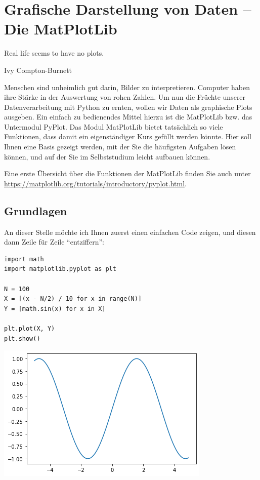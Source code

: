 \chapter{Grafische Darstellung von Daten -- Die MatPlotLib}
\label{chp:Matplotlib}
\epigraph{
	Real life seems to have no plots.
}{Ivy Compton-Burnett}

Menschen sind unheimlich gut darin, Bilder zu interpretieren. Computer haben ihre Stärke in der Auswertung von rohen Zahlen. Um nun die Früchte unserer Datenverarbeitung mit Python zu ernten, wollen wir Daten als graphische Plots ausgeben. Ein einfach zu bedienendes Mittel hierzu ist die MatPlotLib bzw. das Untermodul PyPlot. Das Modul MatPlotLib bietet tatsächlich so viele Funktionen, dass damit ein eigenständiger Kurs gefüllt werden könnte. Hier soll Ihnen eine Basis gezeigt werden, mit der Sie die häufigsten Aufgaben lösen können, und auf der Sie im Selbststudium leicht aufbauen können.

Eine erste Übersicht über die Funktionen der MatPlotLib finden Sie auch unter \url{https://matplotlib.org/tutorials/introductory/pyplot.html}.

\section{Grundlagen}
An dieser Stelle möchte ich Ihnen zuerst einen einfachen Code zeigen, und diesen dann Zeile für Zeile \enquote{entziffern}:

\begin{codebox}[Beispiel: Einfacher Plot, width=.55\linewidth, nobeforeafter, equal height group = grpXmpSimplePlot]
\begin{verbatim}
import math
import matplotlib.pyplot as plt

N = 100
X = [(x - N/2) / 10 for x in range(N)]
Y = [math.sin(x) for x in X]

plt.plot(X, Y)
plt.show()
\end{verbatim}
\end{codebox}
%
\begin{tcolorbox}[title=Ausgabe: Einfacher Plot, width=.45\linewidth, nobeforeafter, equal height group = grpXmpSimplePlot]
	\includegraphics[width=\linewidth]{./gfx/plt-sin}
\end{tcolorbox}

